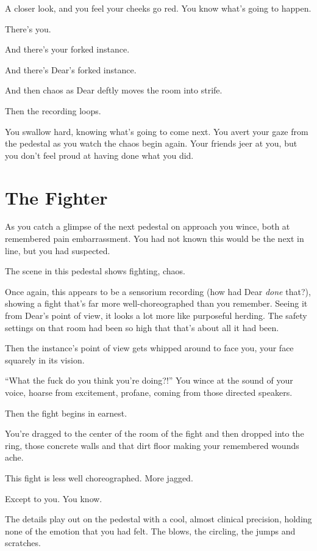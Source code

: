 A closer look, and you feel your cheeks go red. You know what's going to happen.

There's you.

And there's your forked instance.

And there's Dear's forked instance.

And then chaos as Dear deftly moves the room into strife.

Then the recording loops.

You swallow hard, knowing what's going to come next. You avert your gaze from the pedestal as you watch the chaos begin again. Your friends jeer at you, but you don't feel proud at having done what you did.

\newpage
\section*{The Fighter}

As you catch a glimpse of the next pedestal on approach you wince, both at remembered pain embarrassment. You had not known this would be the next in line, but you had suspected.

The scene in this pedestal shows fighting, chaos.

Once again, this appears to be a sensorium recording (how had Dear \emph{done} that?), showing a fight that's far more well-choreographed than you remember. Seeing it from Dear's point of view, it looks a lot more like purposeful herding. The safety settings on that room had been so high that that's about all it had been.

Then the instance's point of view gets whipped around to face you, your face squarely in its vision.

``What the fuck do you think you're doing?!'' You wince at the sound of your voice, hoarse from excitement, profane, coming from those directed speakers.

Then the fight begins in earnest.

You're dragged to the center of the room of the fight and then dropped into the ring, those concrete walls and that dirt floor making your remembered wounds ache.

This fight is less well choreographed. More jagged.

Except to you. You know.

The details play out on the pedestal with a cool, almost clinical precision, holding none of the emotion that you had felt. The blows, the circling, the jumps and scratches.

